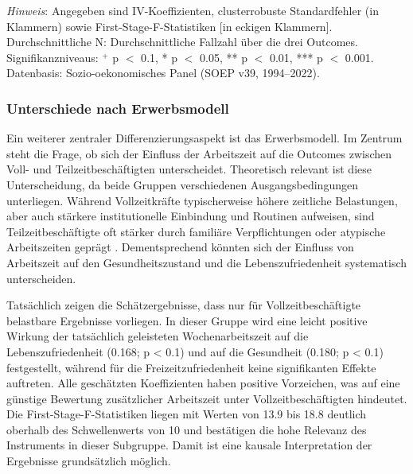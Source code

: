 \documentclass[12pt,a4paper]{article}
\begin{document}
\begin{landscape}
\begin{table}[htbp]
\vspace{0.5em}
\noindent\parbox{\linewidth}{%
  \small
  \textit{Hinweis}: Angegeben sind IV-Koeffizienten, clusterrobuste Standardfehler (in Klammern) sowie First-Stage-F-Statistiken [in eckigen Klammern]. Durchschnittliche N: Durchschnittliche Fallzahl über die drei Outcomes. Signifikanzniveaus: $^{+}$ p $<$ 0{.}1, * p $<$ 0{.}05, ** p $<$ 0{.}01, *** p $<$ 0{.}001. Datenbasis: Sozio-oekonomisches Panel (SOEP v39, 1994--2022).}
\end{table}
\end{landscape}

\subsubsection{Unterschiede nach Erwerbsmodell}
Ein weiterer zentraler Differenzierungsaspekt ist das Erwerbsmodell. Im Zentrum steht die Frage, ob sich der Einfluss der Arbeitszeit auf die Outcomes zwischen Voll- und Teilzeitbeschäftigten unterscheidet. Theoretisch relevant ist diese Unterscheidung, da beide Gruppen verschiedenen Ausgangsbedingungen unterliegen. Während Vollzeitkräfte typischerweise höhere zeitliche Belastungen, aber auch stärkere institutionelle Einbindung und Routinen aufweisen, sind Teilzeitbeschäftigte oft stärker durch familiäre Verpflichtungen oder atypische Arbeitszeiten geprägt \parencite{destatis2025teilzeit,destatis2024care}. Dementsprechend könnten sich der Einfluss von Arbeitszeit auf den Gesundheitszustand und die Lebenszufriedenheit systematisch unterscheiden.

Tatsächlich zeigen die Schätzergebnisse, dass nur für Vollzeitbeschäftigte belastbare Ergebnisse vorliegen. In dieser Gruppe wird eine leicht positive Wirkung der tatsächlich geleisteten Wochenarbeitszeit auf die Lebenszufriedenheit (0{.}168; p < 0{.}1) und auf die Gesundheit (0.180; p < 0.1) festgestellt, während für die Freizeitzufriedenheit keine signifikanten Effekte auftreten. Alle geschätzten Koeffizienten haben positive Vorzeichen, was auf eine günstige Bewertung zusätzlicher Arbeitszeit unter Vollzeitbeschäftigten hindeutet. Die First-Stage-F-Statistiken liegen mit Werten von 13{.}9 bis 18{.}8 deutlich oberhalb des Schwellenwerts von 10 und bestätigen die hohe Relevanz des Instruments in dieser Subgruppe. Damit ist eine kausale Interpretation der Ergebnisse grundsätzlich möglich.
\end{document}
